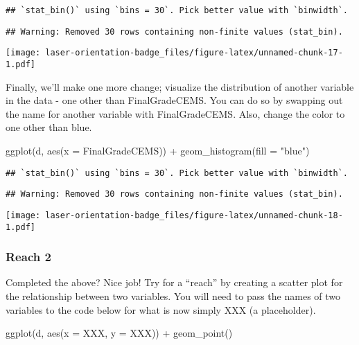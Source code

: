 \documentclass[
]{article}
\newenvironment{Shaded}{\begin{snugshade}}{\end{snugshade}}
\newcommand{\AttributeTok}[1]{\textcolor[rgb]{0.77,0.63,0.00}{#1}}
\newcommand{\FunctionTok}[1]{\textcolor[rgb]{0.00,0.00,0.00}{#1}}
\newcommand{\NormalTok}[1]{#1}
\newcommand{\SpecialCharTok}[1]{\textcolor[rgb]{0.00,0.00,0.00}{#1}}
\newcommand{\StringTok}[1]{\textcolor[rgb]{0.31,0.60,0.02}{#1}}
\begin{document}
\begin{verbatim}
## `stat_bin()` using `bins = 30`. Pick better value with `binwidth`.
\end{verbatim}

\begin{verbatim}
## Warning: Removed 30 rows containing non-finite values (stat_bin).
\end{verbatim}

\texttt{[image: laser-orientation-badge\_files/figure-latex/unnamed-chunk-17-1.pdf]}

Finally, we'll make one more change; visualize the distribution of
another variable in the data - one other than FinalGradeCEMS. You can do
so by swapping out the name for another variable with FinalGradeCEMS.
Also, change the color to one other than blue.

\begin{Shaded}
\begin{Highlighting}[]
\FunctionTok{ggplot}\NormalTok{(d, }\FunctionTok{aes}\NormalTok{(}\AttributeTok{x =}\NormalTok{ FinalGradeCEMS)) }\SpecialCharTok{+}
  \FunctionTok{geom\_histogram}\NormalTok{(}\AttributeTok{fill =} \StringTok{"blue"}\NormalTok{)}
\end{Highlighting}
\end{Shaded}

\begin{verbatim}
## `stat_bin()` using `bins = 30`. Pick better value with `binwidth`.
\end{verbatim}

\begin{verbatim}
## Warning: Removed 30 rows containing non-finite values (stat_bin).
\end{verbatim}

\texttt{[image: laser-orientation-badge\_files/figure-latex/unnamed-chunk-18-1.pdf]}

\hypertarget{reach-2}{%
\subsubsection{Reach 2 🎉}\label{reach-2}}

Completed the above? Nice job! Try for a ``reach'' by creating a scatter
plot for the relationship between two variables. You will need to pass
the names of two variables to the code below for what is now simply XXX
(a placeholder).

\begin{Shaded}
\begin{Highlighting}[]
\FunctionTok{ggplot}\NormalTok{(d, }\FunctionTok{aes}\NormalTok{(}\AttributeTok{x =}\NormalTok{ XXX, }\AttributeTok{y =}\NormalTok{ XXX)) }\SpecialCharTok{+}
  \FunctionTok{geom\_point}\NormalTok{()}
\end{Highlighting}
\end{Shaded}
\end{document}
